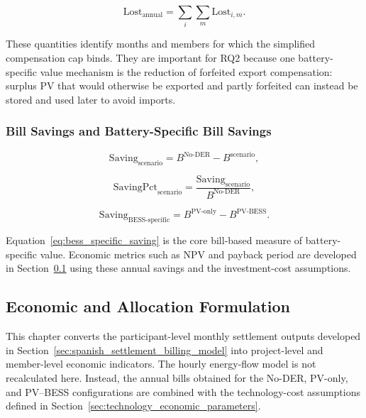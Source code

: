 \begin{equation}
\label{eq:annual_lost_compensation}
\mathrm{Lost}_{\mathrm{annual}} = \sum_i \sum_m \mathrm{Lost}_{i,m}.
\end{equation}

These quantities identify months and members for which the simplified compensation cap binds. They are important for RQ2 because one battery-specific value mechanism is the reduction of forfeited export compensation: surplus PV that would otherwise be exported and partly forfeited can instead be stored and used later to avoid imports.

\subsubsection{Bill Savings and Battery-Specific Bill Savings}
\label{subsec:bill_savings_battery_specific}

\begin{equation}
\label{eq:scenario_saving}
\mathrm{Saving}_{\mathrm{scenario}} = B^{\mathrm{No\mbox{-}DER}} - B^{\mathrm{scenario}},
\end{equation}

\begin{equation}
\label{eq:scenario_saving_pct}
\mathrm{SavingPct}_{\mathrm{scenario}} = \frac{\mathrm{Saving}_{\mathrm{scenario}}}{B^{\mathrm{No\mbox{-}DER}}},
\end{equation}

\begin{equation}
\label{eq:bess_specific_saving}
\mathrm{Saving}_{\mathrm{BESS\mbox{-}specific}} = B^{\mathrm{PV\mbox{-}only}} - B^{\mathrm{PV\mbox{-}BESS}}.
\end{equation}

Equation~\eqref{eq:bess_specific_saving} is the core bill-based measure of battery-specific value. Economic metrics such as NPV and payback period are developed in Section~\ref{sec:economic-framework} using these annual savings and the investment-cost assumptions.
\subsection{Economic and Allocation Formulation}
\label{sec:economic-framework}

This chapter converts the participant-level monthly settlement outputs developed in Section~\ref{sec:spanish_settlement_billing_model} into project-level and member-level economic indicators. The hourly energy-flow model is not recalculated here. Instead, the annual bills obtained for the No-DER, PV-only, and PV--BESS configurations are combined with the technology-cost assumptions defined in Section~\ref{sec:technology_economic_parameters}.

